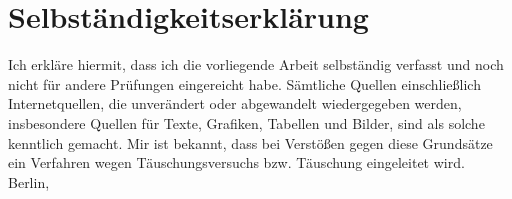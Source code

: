 \section*{Selbst\"andigkeitserkl\"arung}


Ich erkl\"are hiermit, dass ich die vorliegende Arbeit selbst\"andig verfasst und 
noch nicht f\"ur andere Pr\"ufungen eingereicht habe. S\"amtliche Quellen 
einschlie\ss lich Internetquellen, die unver\"andert oder abgewandelt wiedergegeben 
werden, insbesondere Quellen f\"ur Texte, Grafiken, Tabellen und Bilder, sind als 
solche kenntlich gemacht. Mir ist bekannt, dass bei Verst\"o\ss en gegen diese 
Grunds\"atze ein Verfahren wegen T\"auschungsversuchs bzw. T\"auschung eingeleitet 
wird.\\[3cm]
Berlin, \dcdatesubmitted